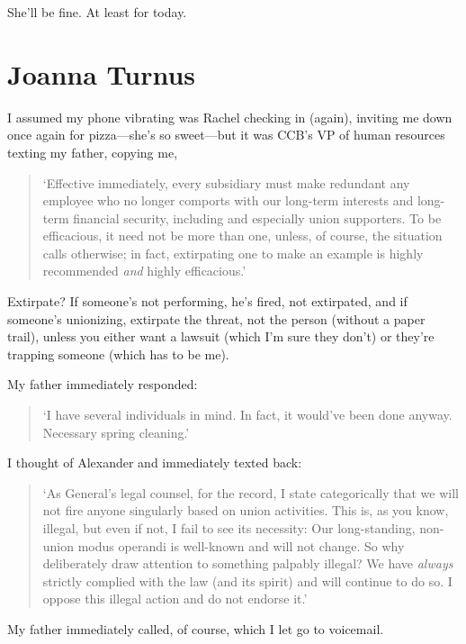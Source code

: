 She'll be fine. At least for today.

\chapter{Joanna Turnus}

\titlemark

I assumed my phone vibrating was Rachel checking in (again), inviting me
down once again for pizza---she's so sweet---but it was CCB's VP of
human resources texting my father, copying me,

\begin{quote}
`Effective immediately, every subsidiary must make redundant any
employee who no longer comports with our long-term interests and
long-term financial security, including and especially union supporters.
To be efficacious, it need not be more than one, unless, of course, the
situation calls otherwise; in fact, extirpating one to make an example
is highly recommended \emph{and} highly efficacious.'
\end{quote}

\noindent Extirpate? If someone's not performing, he's fired, not
extirpated, and if someone's unionizing, extirpate the threat, not the
person (without a paper trail), unless you either want a lawsuit (which
I'm sure they don't) or they're trapping someone (which has to be me).

My father immediately responded:

\begin{quote}
`I have several individuals in mind. In fact, it would've been done
anyway. Necessary spring cleaning.'
\end{quote}

\noindent I thought of Alexander and immediately texted back:

\begin{quote}
`As General's legal counsel, for the record, I state categorically that
we will not fire anyone singularly based on union activities. This is,
as you know, illegal, but even if not, I fail to see its necessity: Our
long-standing, non-union modus operandi is well-known and will not
change. So why deliberately draw attention to something palpably
illegal? We have \emph{always} strictly complied with the law (and its
spirit) and will continue to do so. I oppose this illegal action and do
not endorse it.'
\end{quote}

\noindent My father immediately called, of course, which I let go to
voicemail.


